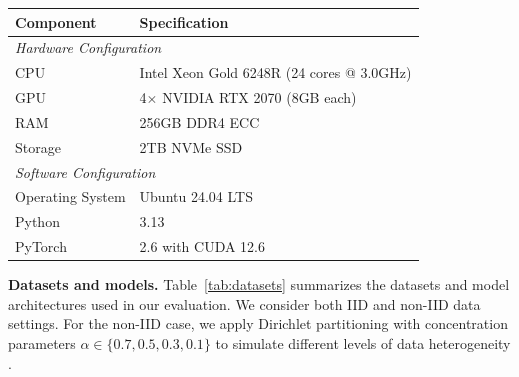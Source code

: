 \documentclass[lettersize,journal]{IEEEtran}
\begin{document}
{\begin{table}
\begin{tabular}{ll} 
\toprule
\rowcolor[rgb]{0.816,0.816,0.816} \textbf{Component} & \textbf{Specification} \\ 
\midrule
\multicolumn{2}{l}{\textit{Hardware Configuration}} \\ 
\hdashline
CPU & Intel Xeon Gold 6248R (24 cores @ 3.0GHz) \\
GPU & 4$\times$ NVIDIA RTX 2070 (8GB each) \\
RAM & 256GB DDR4 ECC \\
Storage & 2TB NVMe SSD \\
\midrule
\multicolumn{2}{l}{\textit{Software Configuration}} \\ 
\hdashline
Operating System & Ubuntu 24.04 LTS \\
Python & 3.13 \\
PyTorch & 2.6 with CUDA 12.6 \\
\bottomrule
\end{tabular}

\end{table}
\textbf{Datasets and models.} Table~\ref{tab:datasets} summarizes the datasets and model architectures used in our evaluation. We consider both IID and non-IID data settings. For the non-IID case, we apply Dirichlet partitioning with concentration parameters $\alpha \in \{0.7, 0.5, 0.3, 0.1\}$ to simulate different levels of data heterogeneity \cite{li2021federatedlearningnonIIDdata,pmlr-v54-mcmahan17a,liang2025fednoisyfederatednoisylabel}.

\begin{table}
\centering
\scriptsize
\setlength{\extrarowheight}{0pt}
\setlength{\aboverulesep}{0pt}
\setlength{\belowrulesep}{0pt}
\caption{Dataset Characteristics and Model Architectures}
\label{tab:datasets}
\end{table}

}
\end{document}
